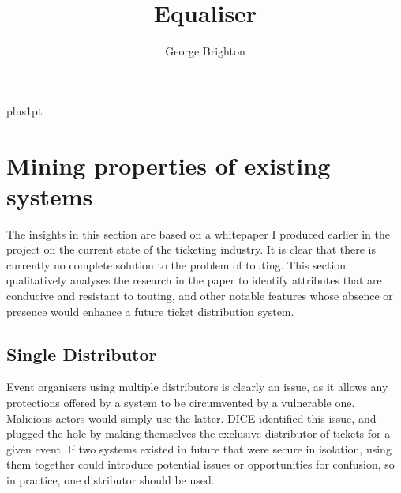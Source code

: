 \documentclass[12pt]{bhamdissertation}
\title{Equaliser}
\author{George Brighton}             %
\begin{document}
\baselineskip=18pt plus1pt

\setcounter{secnumdepth}{3}
\setcounter{tocdepth}{1}

\maketitle                  %

\begin{romanpages}          %

\tableofcontents

\cleardoublepage{}
\begin{abstract}
\lipsum[1-1] %
\end{abstract}

\cleardoublepage{}
\begin{acknowledgements}
\lipsum[2-2] %
\end{acknowledgements}

\end{romanpages}            %

\chapter{Mining properties of existing systems}

The insights in this section are based on a whitepaper \autocite{B17} I produced earlier in the project on the current state of the ticketing industry. It is clear that there is currently no complete solution to the problem of touting. This section qualitatively analyses the research in the paper to identify attributes that are conducive and resistant to touting, and other notable features whose absence or presence would enhance a future ticket distribution system.

\section{Single Distributor}

Event organisers using multiple distributors is clearly an issue, as it allows any protections offered by a system to be circumvented by a vulnerable one. Malicious actors would simply use the latter. DICE identified this issue, and plugged the hole by making themselves the exclusive distributor of tickets for a given event. If two systems existed in future that were secure in isolation, using them together could introduce potential issues or opportunities for confusion, so in practice, one distributor should be used.
\end{document}

